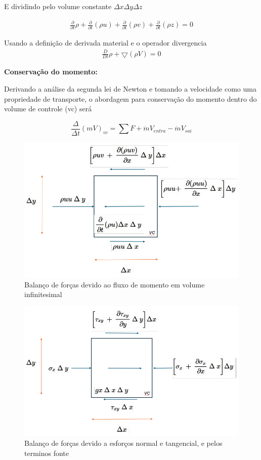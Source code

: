 \documentclass[]{article}
\begin{document}
E dividindo pelo volume constante $\Delta x \Delta y  \Delta z$

\begin{equation}
	\begin{aligned}
		\frac{\partial}{\partial t} \rho + \frac{\partial}{\partial t} (\rho u) + \frac{\partial}{\partial t} (\rho v) + \frac{\partial}{\partial t} (\rho z) = 0 
	\end{aligned}
\end{equation}

Usando a definição de derivada material e o operador divergencia
\begin{equation}
	\begin{aligned}
		\frac{D}{D t} \rho +  \bigtriangledown (\rho V)= 0 
	\end{aligned}
\end{equation}


\textbf{Conservação do momento:} 

Derivando a análise da segunda lei de Newton e tomando a velocidade como uma propriedade de transporte, o abordagem para conservação do momento dentro do volume de controle (vc) será

\begin{equation}
	\frac{\Delta }{\Delta t} (mV)_{vc}= \sum F +\dot{m}V_{entra} - \dot{m}V_{sai}
\end{equation}

\begin{figure}[H]
	\centering
	\includegraphics[width=.65\textwidth]{Figures/1_2}
	\caption{Balanço de forças devido ao fluxo de momento em volume infinitesimal}
\end{figure}

\begin{figure}[H]
	\centering
	\includegraphics[width=.65\textwidth]{Figures/1_3}
	\caption{Balanço de forças devido a esforços normal e tangencial, e pelos terminos fonte}
\end{figure}
\end{document}
